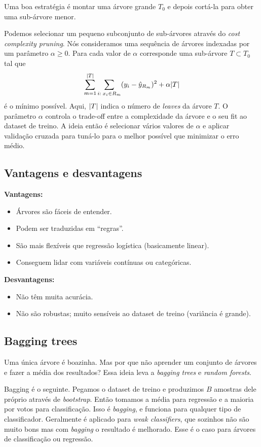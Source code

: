 \documentclass[a4paper,fleqn,12pt]{article}
\begin{document}
Uma boa estratégia é montar uma árvore grande $T_0$ e depois cortá-la para obter uma sub-árvore menor.

Podemos selecionar um pequeno subconjunto de sub-árvores através do \textit{cost complexity pruning}. Nós consideramos uma sequência de árvores indexadas por um parâmetro $\alpha \geq 0$. Para cada valor de $\alpha$ corresponde uma sub-árvore $T \subset T_0$ tal que
$$
\sum_{m=1}^{\abs{T}} \sum_{i: \; x_i \in R_m} (y_i - \hat{y}_{R_m})^2
+ \alpha \abs{T}
$$
é o mínimo possível. Aqui, $\abs{T}$ indica o número de \textit{leaves} da árvore $T$. O parâmetro $\alpha$ controla o trade-off entre a complexidade da árvore e o seu fit ao dataset de treino. A ideia então é selecionar vários valores de $\alpha$ e aplicar validação cruzada para tuná-lo para o melhor possível que minimizar o erro médio.

\subsection{Vantagens e desvantagens}

\textbf{Vantagens:}
\begin{itemize}
\item Árvores são fáceis de entender.
\item Podem ser traduzidas em ``regras''.
\item São mais flexíveis que regressão logística (basicamente linear).
\item Conseguem lidar com variáveis contínuas ou categóricas.
\end{itemize}

\textbf{Desvantagens:}
\begin{itemize}
\item Não têm muita acurácia.
\item Não são robustas; muito sensíveis ao dataset de treino (variância é grande).
\end{itemize}

\subsection{Bagging trees}

Uma única árvore é boazinha. Mas por que não aprender um conjunto de árvores e fazer a média dos resultados? Essa ideia leva a \textit{bagging trees} e \textit{random forests}.

Bagging é o seguinte. Pegamos o dataset de treino e produzimos $B$ amostras dele próprio através de \textit{bootstrap}. Então tomamos a média para regressão e a maioria por votos para classificação. Isso é \textit{bagging}, e funciona para qualquer tipo de classificador. Geralmente é aplicado para \textit{weak classifiers}, que sozinhos não são muito bons mas com \textit{bagging} o resultado é melhorado. Esse é o caso para árvores de classificação ou regressão.
\end{document}
